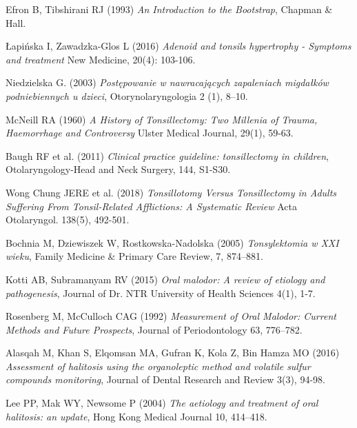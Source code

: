 \documentclass[12pt,a4paper,notitlepage]{report}
\begin{document}
\begin{thebibliography}{26}


 Efron B, Tibshirani RJ (1993) \emph{An Introduction to the Bootstrap}, Chapman \&  Hall. 

 Łapińska I, Zawadzka-Glos L (2016) \emph{Adenoid and tonsils hypertrophy - Symptoms and treatment} New Medicine, 20(4): 103-106.

 Niedzielska G. (2003) \emph{Postępowanie w nawracających zapaleniach migdałków podniebiennych u dzieci}, Otorynolaryngologia 2 (1), 8–10.

 McNeill RA (1960) \emph{A History of Tonsillectomy: Two Millenia of Trauma, Haemorrhage and Controversy} Ulster Medical Journal, 29(1), 59-63. 

 Baugh RF et al. (2011) \emph {Clinical practice guideline: tonsillectomy in children},  Otolaryngology-Head and Neck Surgery, 144, S1-S30.

 Wong Chung JERE et al. (2018) \emph{Tonsillotomy Versus Tonsillectomy in Adults Suffering From Tonsil-Related Afflictions: A Systematic Review} Acta Otolaryngol. 138(5), 492-501.


 Bochnia M, Dziewiszek W, Rostkowska-Nadolska (2005) \emph{Tonsylektomia w XXI wieku}, Family Medicine \& Primary Care Review, 7,  874–881.

 Kotti AB, Subramanyam RV (2015) \emph{Oral malodor: A review of etiology and pathogenesis}, Journal of Dr. NTR University of Health Sciences 4(1), 1-7.

 Rosenberg M, McCulloch CAG (1992) \emph{Measurement of Oral Malodor: Current Methods and Future Prospects}, Journal of Periodontology 63, 776–782.

 Alasqah M, Khan S, Elqomsan MA, Gufran K, Kola Z, Bin Hamza MO (2016) \emph{Assessment of halitosis using the organoleptic method and volatile sulfur compounds monitoring}, Journal of Dental Research and Review 3(3), 94-98.

 Lee PP, Mak WY, Newsome P (2004) \emph{The aetiology and treatment of oral halitosis: an update}, Hong Kong Medical Journal  10, 414–418.


\end{thebibliography}
\end{document}
